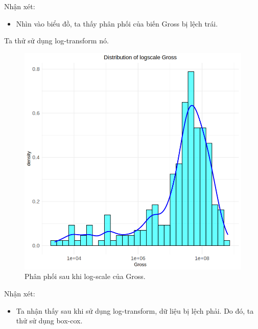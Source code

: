 Nhận xét:
\begin{itemize}
    \item Nhìn vào biểu đồ, ta thấy phân phối của biến Gross bị lệch trái.
\end{itemize}

Ta thử sử dụng log-transform nó.

\begin{figure}[H]
    \centering
    \includegraphics[width=0.75\columnwidth]{csm_figures/gross_logscale_distribution.png}
    \caption{Phân phối sau khi log-scale của Gross.}
    \label{fig:gross_logscale_distribution}
\end{figure}
Nhận xét:
\begin{itemize}
    \item Ta nhận thấy sau khi sử dụng log-transform, dữ liệu bị lệch phải. Do đó, ta thử sử dụng box-cox.
\end{itemize}

